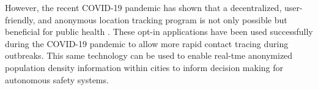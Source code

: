 However, the recent COVID-19 pandemic has shown that a decentralized, user-friendly, and anonymous location tracking program is not only possible but beneficial for public health \cite{cohen_digital_2020, lee_benefits_2021}. These opt-in applications have been used successfully during the COVID-19 pandemic to allow more rapid contact tracing during outbreaks. This same technology can be used to enable real-tme anonymized population density information within cities to inform decision making for autonomous safety systems.








